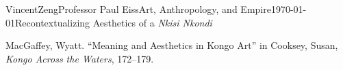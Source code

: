 \documentclass[12pt]{article}
\begin{document}
\begin{mla}{Vincent}{Zeng}{Professor Paul Eiss}{Art, Anthropology, and
    Empire}{\today}{Recontextualizing Aesthetics of a \textit{Nkisi Nkondi}}
\begin{workscited}
  \bibent
  MacGaffey, Wyatt. ``Meaning and Aesthetics in Kongo Art'' in Cooksey, Susan, \textit{Kongo Across the Waters}, 172--179.

\end{workscited}
\end{mla}
\end{document}
